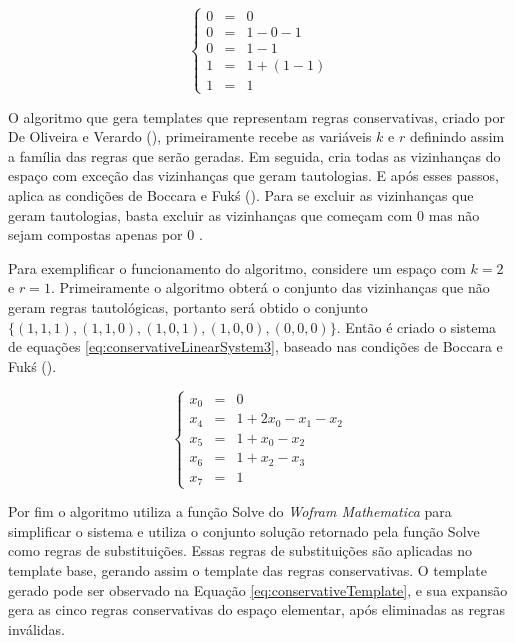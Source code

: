 \documentclass[12pt,a4paper]{article}
\begin{document}
	\begin{equation}
	\left\{\begin{matrix}
	 0 & = & 0 \\ 
	 0 & = & 1 - 0 - 1 \\ 
	 0 & = & 1 - 1 \\ 
	 1 & = & 1 + (1 - 1)\\ 
	 1 & = & 1 
	\end{matrix}\right.
	\label{eq:conservativeAC204}
	\end{equation}

	O algoritmo que gera templates que representam regras conservativas, criado por De Oliveira e Verardo (\citeyear{deOliveira2014}), primeiramente recebe as variáveis $k$ e $r$ definindo assim a família das regras que serão geradas. Em seguida, cria todas as vizinhanças do espaço com exceção das vizinhanças que geram tautologias. E após esses passos, aplica as condições de Boccara e Fukś (\citeyear{boccara2002}). Para se excluir as vizinhanças que geram tautologias, basta excluir as vizinhanças que começam com 0 mas não sejam compostas apenas por 0 \cite{Schranko2010}.

	Para exemplificar o funcionamento do algoritmo, considere um espaço com $k=2$ e $r=1$. Primeiramente o algoritmo obterá o conjunto das vizinhanças que não geram regras tautológicas, portanto será obtido o conjunto $\{(1,1,1),(1,1,0),(1,0,1),(1,0,0),(0,0,0)\}$. Então é criado o sistema de equações \ref{eq:conservativeLinearSystem3}, baseado nas condições de Boccara e Fukś (\citeyear{boccara2002}).

	\begin{equation}
	\left\{\begin{matrix}
	 x_0 & = & 0\\ 
	 x_4 & = & 1 +2x_0 -x_1 -x_2\\ 
	 x_5 & = & 1 +x_0 -x_2\\
	 x_6 & = & 1 +x_2 -x_3\\ 
	 x_7 & = & 1
	\end{matrix}\right.
	\label{eq:conservativeLinearSystem3}
	\end{equation}

	Por fim o algoritmo utiliza a função Solve do \textit{Wofram Mathematica} para simplificar o sistema e utiliza o conjunto solução retornado pela função Solve como regras de substituições. Essas regras de substituições são aplicadas no template base, gerando assim o template das regras conservativas. O template gerado pode ser observado na Equação \ref{eq:conservativeTemplate}, e sua expansão gera as cinco regras conservativas do espaço elementar, após eliminadas as regras inválidas.
\end{document}
